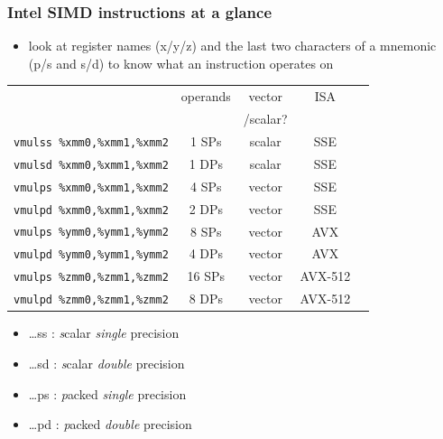 \documentclass[12pt,dvipdfmx]{beamer}
\newcommand{\mura}[1]{{\color{purple}#1}}
\newcommand{\ao}[1]{{\color{blue}#1}}
\newcommand{\aka}[1]{{\color{red}#1}}
\begin{document}
\begin{frame}
  \frametitle{Intel SIMD instructions at a glance}
  \begin{itemize}
  \item look at register names (x/y/z) and
    the last two characters of a mnemonic (p/s and s/d)
    to know what an instruction operates on
  \end{itemize}

\begin{center}
{\footnotesize
\begin{tabular}{|l|c|c|c|c|}\hline
                     & operands & vector   & ISA \\
                     &          & /scalar? &     \\
\hline
  {\tt vmul\ao{s}\mura{s} \%xmm0,\%xmm1,\%xmm2} &  1 SPs & scalar & SSE \\
  {\tt vmul\ao{s}\mura{d} \%xmm0,\%xmm1,\%xmm2} &  1 DPs & scalar & SSE \\
  {\tt vmul\ao{p}s \%\aka{x}mm0,\%xmm1,\%xmm2} &  4 SPs & vector & SSE \\
  {\tt vmulpd \%xmm0,\%xmm1,\%xmm2} &  2 DPs & vector & SSE \\
  {\tt vmulps \%\aka{y}mm0,\%ymm1,\%ymm2} &  8 SPs & vector & AVX \\
  {\tt vmulpd \%ymm0,\%ymm1,\%ymm2} &  4 DPs & vector & AVX \\
  {\tt vmulps \%\aka{z}mm0,\%zmm1,\%zmm2} & 16 SPs & vector & AVX-512 \\
  {\tt vmulpd \%zmm0,\%zmm1,\%zmm2} &  8 DPs & vector & AVX-512 \\
\hline
\end{tabular}}
\end{center}

\begin{itemize}
\item \ldots \ao{ss} : {\em s}calar {\em single} precision
\item \ldots \ao{sd} : {\em s}calar {\em double} precision
\item \ldots \ao{ps} : {\em p}acked {\em single} precision
\item \ldots \ao{pd} : {\em p}acked {\em double} precision
\end{itemize}

\end{frame}
\end{document}
